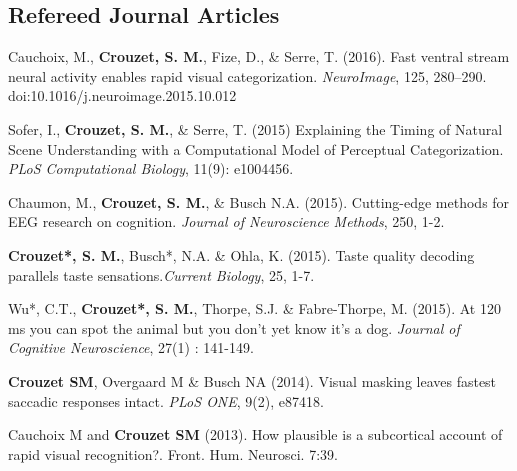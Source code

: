 \documentclass[margin,line]{resume}
\begin{document}
\begin{resume}


	\vspace{3mm}	
    \section{\mysidestyle Refereed Journal Articles}
    	  Cauchoix, M., \textbf{Crouzet, S. M.}, Fize, D., \& Serre, T. (2016). Fast ventral stream neural activity enables rapid visual categorization. \textit{NeuroImage}, 125, 280–290. doi:10.1016/j.neuroimage.2015.10.012

	\vspace{-2mm} Sofer, I., \textbf{Crouzet, S. M.}, \& Serre, T. (2015) Explaining the Timing of Natural Scene Understanding with a Computational Model of Perceptual Categorization. \textit{PLoS Computational Biology}, 11(9): e1004456.

	\vspace{-2mm} Chaumon, M., \textbf{Crouzet, S. M.}, \& Busch N.A. (2015). Cutting-edge methods for EEG research on cognition. \textit{Journal of Neuroscience Methods}, 250, 1-2.

	\vspace{-2mm}  \textbf{Crouzet*, S. M.}, Busch*, N.A. \& Ohla, K. (2015). Taste quality decoding parallels taste sensations.\textit{Current Biology}, 25, 1-7.
		
	\vspace{-2mm}  Wu*, C.T.,  \textbf{Crouzet*, S. M.}, Thorpe, S.J. \& Fabre-Thorpe, M. (2015). At 120 ms you can spot the animal but you don't yet know it's a dog. \textit{Journal of Cognitive Neuroscience},  27(1) : 141-149.
			
  	\vspace{-2mm}  \textbf{Crouzet SM}, Overgaard M \& Busch NA (2014). Visual masking leaves fastest saccadic responses intact. \textit{PLoS ONE}, 9(2), e87418.

  	\newpage
	
	\vspace{-2mm} Cauchoix M and \textbf{Crouzet SM} (2013). How plausible is a subcortical account of rapid visual recognition?. Front. Hum. Neurosci. 7:39.
	

\end{resume}
\end{document}

